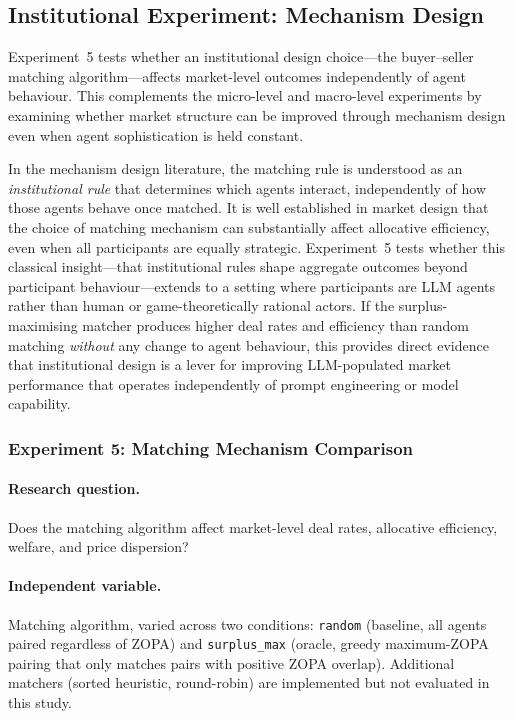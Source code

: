 
\subsection{Institutional Experiment: Mechanism Design}
\label{sec:exp-institutional}

Experiment~5 tests whether an institutional design choice---the buyer--seller matching algorithm---affects market-level outcomes independently of agent behaviour.  This complements the micro-level and macro-level experiments by examining whether market structure can be improved through mechanism design even when agent sophistication is held constant.

In the mechanism design literature, the matching rule is understood as an \emph{institutional rule} that determines which agents interact, independently of how those agents behave once matched.  It is well established in market design that the choice of matching mechanism can substantially affect allocative efficiency, even when all participants are equally strategic.  Experiment~5 tests whether this classical insight---that institutional rules shape aggregate outcomes beyond participant behaviour---extends to a setting where participants are LLM agents rather than human or game-theoretically rational actors.  If the surplus-maximising matcher produces higher deal rates and efficiency than random matching \emph{without} any change to agent behaviour, this provides direct evidence that institutional design is a lever for improving LLM-populated market performance that operates independently of prompt engineering or model capability.

\subsubsection{Experiment 5: Matching Mechanism Comparison}
\label{sec:exp-mechanism}

\paragraph{Research question.}
Does the matching algorithm affect market-level deal rates, allocative efficiency, welfare, and price dispersion?

\paragraph{Independent variable.}
Matching algorithm, varied across two conditions: \texttt{random} (baseline, all agents paired regardless of ZOPA) and \texttt{surplus\_max} (oracle, greedy maximum-ZOPA pairing that only matches pairs with positive ZOPA overlap).  Additional matchers (sorted heuristic, round-robin) are implemented but not evaluated in this study.

